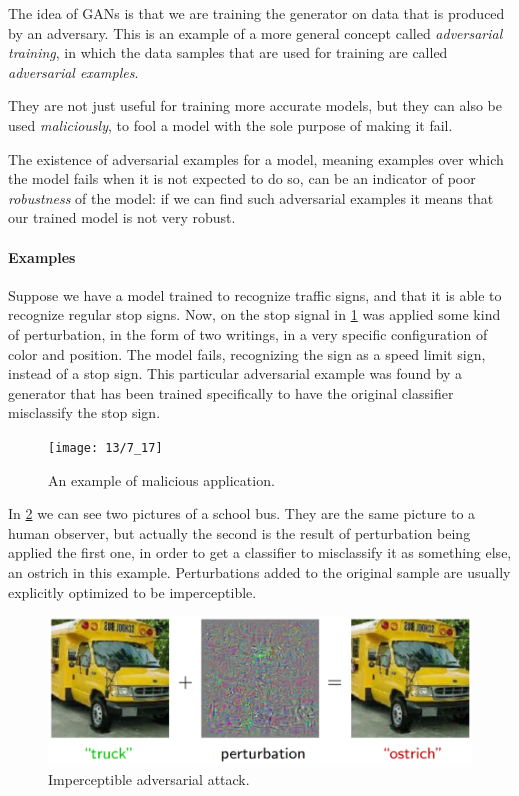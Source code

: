 
The idea of GANs is that we are training the generator on data that is produced by an adversary. This is an example of a more general concept called \emph{adversarial training}, in which the data samples that are used for training are called \emph{adversarial examples}.

They are not just useful for training more accurate models, but they can also be used \emph{maliciously}, to fool a model with the sole purpose of making it fail.

The existence of adversarial examples for a model, meaning examples over which the model fails when it is not expected to do so, can be an indicator of poor \emph{robustness} of the model: if we can find such adversarial examples it means that our trained model is not very robust.

\paragraph{Examples}

Suppose we have a model trained to recognize traffic signs, and that it is able to recognize regular stop signs. Now, on the stop signal in \cref{fig:malicious} was applied some kind of perturbation, in the form of two writings, in a very specific configuration of color and position. The model fails, recognizing the sign as a speed limit sign, instead of a stop sign. This particular adversarial example was found by a generator that has been trained specifically to have the original classifier misclassify the stop sign.

\begin{figure}[H]
	\centering
	\texttt{[image: 13/7\_17]}
	\caption{An example of malicious application. }\label{fig:malicious}	
\end{figure}

In \cref{fig:schoolbus} we can see two pictures of a school bus. They are the same picture to a human observer, but actually the second is the result of perturbation being applied the first one, in order to get a classifier to misclassify it as something else, an ostrich in this example. Perturbations added to the original sample are usually explicitly optimized to be imperceptible.

\begin{figure}[H]
    \centering
    \includegraphics[width=.7\textwidth]{figures/13/8_17.png}
    \caption{Imperceptible adversarial attack.}
    \label{fig:schoolbus}
\end{figure}

